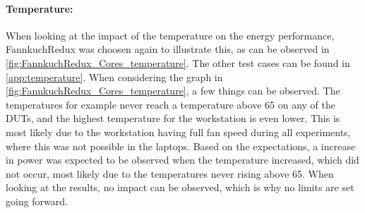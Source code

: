 


\paragraph{Temperature:} When looking at the impact of the temperature on the energy performance, FannkuchRedux was choosen again to illustrate this, as can be observed in \cref*{fig:FannkuchRedux_Cores_temperature}. The other test cases can be found in \cref{app:temperature}. When considering the graph in \cref{fig:FannkuchRedux_Cores_temperature}, a few things can be observed. The temperatures for example never reach a temperature above 65 on any of the DUTs, and the highest temperature for the workstation is even lower. This is most likely due to the workstation having full fan speed during all experiments, where this was not possible in the laptops. Based on the expectations, a increase in power was expected to be observed when the temperature increased, which did not occur, most likely due to the temperatures never rising above 65. When looking at the results, no impact can be observed, which is why no limits are set going forward.






